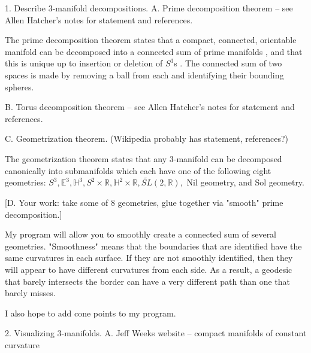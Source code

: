 \documentclass[12pt]{amsart}
\newcommand{\ignore}[1]{}
\begin{document}
1.  Describe 3-manifold decompositions.
  A.  Prime decomposition theorem -- see Allen Hatcher's notes for statement and references.


\ignore{@Misc{•,
OPTkey = {•},
OPTauthor = {Allen Hatcher},
OPTtitle = {Notes on Basic 3-Manifold Topology},
OPThowpublished = {•},
OPTmonth = {•},
OPTyear = {•},
OPTnote = {•},
OPTannote = {•}
}}

The prime decomposition theorem states that a compact, connected, orientable manifold can be decomposed into a connected sum of prime manifolds \cite{Kneser}, and that this is unique up to insertion or deletion of $S^3$s \cite{Milnor}. The connected sum of two spaces is made by removing a ball from each and identifying their bounding spheres.
  
  B.  Torus decomposition theorem -- see Allen Hatcher's notes for statement and references.
  
  C.  Geometrization theorem.  (Wikipedia probably has statement, references?)

The geometrization theorem states that any 3-manifold can be decomposed canonically into submanifolds which each have one of the following eight geometries: $S^3, \mathbb{E}^3, \mathbb{H}^3, S^2 \times \mathbb{R}, \mathbb{H}^2 \times \mathbb{R}, \tilde{SL}(2,\mathbb{R}),$ Nil geometry, and Sol geometry.


  [D.  Your work:  take some of 8 geometries, glue together via "smooth" prime decomposition.]

My program will allow you to smoothly create a connected sum of several geometries. "Smoothness" means that the boundaries that are identified have the same curvatures in each surface. If they are not smoothly identified, then they will appear to have different curvatures from each side. As a result, a geodesic that barely intersects the border can have a very different path than one that barely misses.


I also hope to add cone points to my program.


2.  Visualizing 3-manifolds.
  A.  Jeff Weeks website -- compact manifolds of constant curvature
\end{document}
